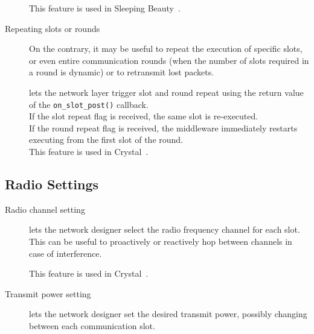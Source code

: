 \begin{description}
	This feature is used \eg in Sleeping Beauty~\cite{sarkar2016Sleeping}.

	\item [Repeating slots or rounds]
	On the contrary, it may be useful to repeat the execution of specific slots, or even entire communication rounds (\eg when the number of slots required in a round is dynamic) or to retransmit lost packets.

	\baloo lets the network layer trigger slot and round repeat using the return value of the \texttt{on\_slot\_post()} callback.\\
		\inlineitem
		If the slot repeat flag is received, the same slot is re-executed.\\
		\inlineitem
		If the round repeat flag is received, the middleware immediately restarts executing from the first slot of the round.\\
	This feature is used \eg in Crystal~\cite{istomin2018Interferenceresilient}.


\end{description}

\subsection{Radio Settings}
\label{subsec:adv_radio}


\begin{description}
	\item [Radio channel setting]
	\baloo lets the network designer select the radio frequency channel for each slot. This can be useful to proactively or reactively hop between channels in case of interference.

	This feature is used \eg in Crystal~\cite{istomin2018Interferenceresilient}.

	\item [Transmit power setting]
	\baloo lets the network designer set the desired transmit power, possibly changing between each communication slot.

\end{description}
